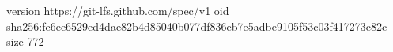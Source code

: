 version https://git-lfs.github.com/spec/v1
oid sha256:fe6ee6529ed4dae82b4d85040b077df836eb7e5adbe9105f53c03f417273c82c
size 772
